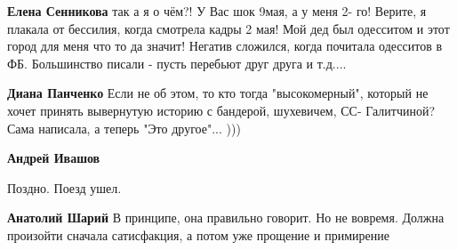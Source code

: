 \begin{itemize}
\begin{itemize}
 
\textbf{Елена Сенникова} так а я о чём?! У Вас шок 9мая, а у меня 2- го! Верите, я плакала от бессилия, когда смотрела кадры 2 мая! Мой дед был одесситом и этот город для меня что то да значит! Негатив сложился, когда почитала одесситов в ФБ. Большинство писали - пусть перебьют друг друга и т.д....

 
\textbf{Диана Панченко} Если не об этом, то кто тогда "высокомерный", который не хочет принять вывернутую историю с бандерой, шухевичем, СС- Галитчиной? Сама написала, а теперь "Это другое"... )))

 
\textbf{Андрей Ивашов} 👏👏👏

 
Поздно. Поезд ушел.

 
\textbf{Анатолий Шарий} В принципе, она правильно говорит. Но не вовремя. Должна произойти сначала сатисфакция, а потом уже прощение и примирение

 

\end{itemize}
\end{itemize}
